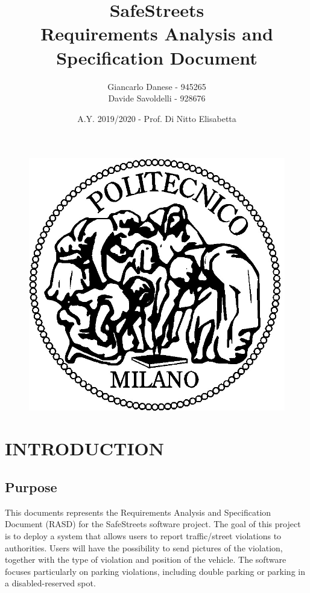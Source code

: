\documentclass[12pt,a4paper]{article}
\author{Giancarlo Danese - 945265 \\
Davide Savoldelli - 928676}
\date{A.Y. 2019/2020 - Prof. Di Nitto Elisabetta}
\title{
 \textbf{\Huge{SafeStreets}} \\
 \large Requirements Analysis and Specification Document
}
\begin{document}
 \begin{figure}
  \centering
  \includegraphics[width=1.0\linewidth]{../assets/images/logo_poli.jpg}
 \end{figure}

 \maketitle
 \newpage
 \tableofcontents
 \newpage

\section{INTRODUCTION}
\subsection{Purpose} 
This documents represents the Requirements Analysis and Specification Document (RASD) for the SafeStreets software project.
The goal of this project is to deploy a system that allows users to report traffic/street violations to authorities. \newline
Users will have the possibility to send pictures of the violation, together with the type of violation and position of the vehicle. The software focuses particularly on parking violations, including double parking or parking in a disabled-reserved spot.
\end{document}
